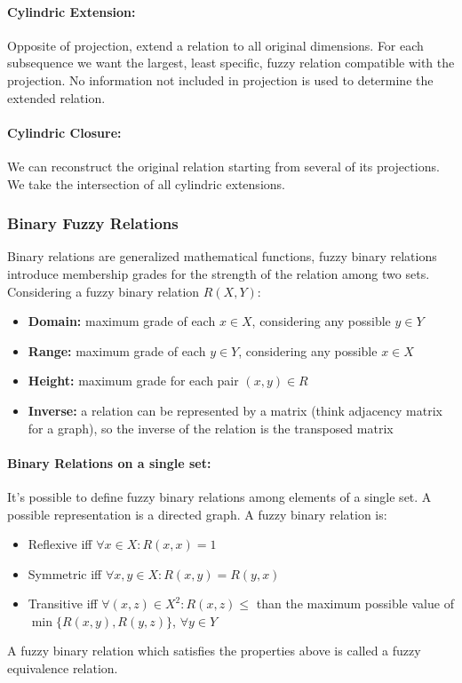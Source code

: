  \paragraph{Cylindric Extension:} Opposite of projection, extend a relation to all original dimensions. For each subsequence we want the largest, least specific, fuzzy relation compatible with the projection. No information not included in projection is used to determine the extended relation.\\
 
 \paragraph{Cylindric Closure:} We can reconstruct the original relation starting from several of its projections. We take the intersection of all cylindric extensions.\\
 
\subsubsection{Binary Fuzzy Relations}
Binary relations are generalized mathematical functions, fuzzy binary relations introduce membership grades for the strength of the relation among two sets.\\

Considering a fuzzy binary relation $R(X,Y)$:
\begin{itemize}
	\item \textbf{Domain:} maximum grade of each $x \in X$, considering any possible $y \in Y$
	\item \textbf{Range:} maximum grade of each $y \in Y$, considering any possible $x \in X$
	\item \textbf{Height:} maximum grade for each pair $(x,y) \in R$
	\item \textbf{Inverse:} a relation can be represented by a matrix (think adjacency matrix for a graph), so the inverse of the relation is the transposed matrix
\end{itemize}

\paragraph{Binary Relations on a single set:} It's possible to define fuzzy binary relations among elements of a single set. A possible representation is a directed graph. A fuzzy binary relation is:
\begin{itemize}
	\item Reflexive iff $\forall x \in X: R(x,x) = 1$
	\item Symmetric iff $\forall x,y \in X: R(x,y) = R(y,x)$
	\item Transitive iff $\forall (x,z) \in X^2: R(x,z) \leq$ than the maximum possible value of $\min \{R(x,y), R(y,z)\}$, $\forall y \in Y$
\end{itemize}
A fuzzy binary relation which satisfies the properties above is called a fuzzy equivalence relation.\\

